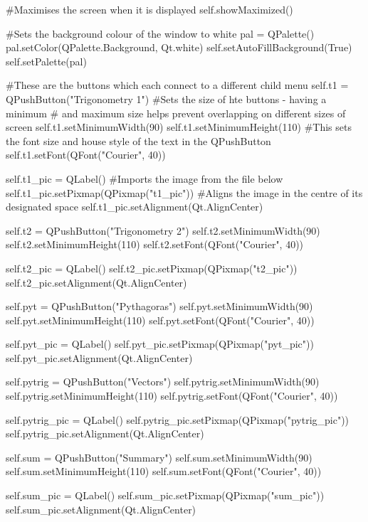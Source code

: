 \begin{landscape}
\begin{python}
        #Maximises the screen when it is displayed
        self.showMaximized()

        #Sets the background colour of the window to white
        pal = QPalette()
        pal.setColor(QPalette.Background, Qt.white)
        self.setAutoFillBackground(True)
        self.setPalette(pal)

        #These are the buttons which each connect to  a different child menu
        self.t1 = QPushButton("Trigonometry 1")
        #Sets the size of hte buttons - having a minimum
        # and maximum size helps prevent overlapping on different sizes of screen
        self.t1.setMinimumWidth(90)
        self.t1.setMinimumHeight(110)
        #This sets the font size and house style of the text in the QPushButton
        self.t1.setFont(QFont("Courier", 40))
        
        self.t1_pic = QLabel()
        #Imports the image from the file below
        self.t1_pic.setPixmap(QPixmap("t1_pic"))
        #Aligns the image in the centre of its designated space
        self.t1_pic.setAlignment(Qt.AlignCenter)
        
        self.t2 = QPushButton("Trigonometry 2")
        self.t2.setMinimumWidth(90)
        self.t2.setMinimumHeight(110)
        self.t2.setFont(QFont("Courier", 40))
        
        self.t2_pic = QLabel()
        self.t2_pic.setPixmap(QPixmap("t2_pic"))
        self.t2_pic.setAlignment(Qt.AlignCenter)
        
        self.pyt = QPushButton("Pythagoras")
        self.pyt.setMinimumWidth(90)
        self.pyt.setMinimumHeight(110)
        self.pyt.setFont(QFont("Courier", 40))
        
        self.pyt_pic = QLabel()
        self.pyt_pic.setPixmap(QPixmap("pyt_pic"))
        self.pyt_pic.setAlignment(Qt.AlignCenter)
        
        self.pytrig = QPushButton("Vectors")
        self.pytrig.setMinimumWidth(90)
        self.pytrig.setMinimumHeight(110)
        self.pytrig.setFont(QFont("Courier", 40))
        
        self.pytrig_pic = QLabel()
        self.pytrig_pic.setPixmap(QPixmap("pytrig_pic"))
        self.pytrig_pic.setAlignment(Qt.AlignCenter)
        
        self.sum = QPushButton("Summary")
        self.sum.setMinimumWidth(90)
        self.sum.setMinimumHeight(110)
        self.sum.setFont(QFont("Courier", 40))
        
        self.sum_pic = QLabel()
        self.sum_pic.setPixmap(QPixmap("sum_pic"))
        self.sum_pic.setAlignment(Qt.AlignCenter)


\end{python}
\end{landscape}
